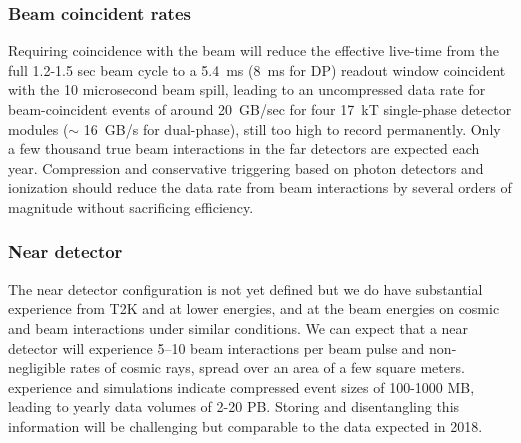 \subsubsection{Beam coincident rates}

Requiring  coincidence with the  beam will reduce the effective live-time from the full 1.2-1.5 sec beam cycle to a 5.4~ms (8~ms for DP)  readout window coincident with the 10 microsecond beam spill, leading to an uncompressed data rate for beam-coincident events of around 20~GB/sec for four 17~kT single-phase detector modules ($\sim$ 16~GB/s for dual-phase), still too high to record permanently.
Only a few thousand true beam interactions in the far detectors are expected each year.  Compression and conservative triggering based on photon detectors and ionization should reduce the data rate from beam interactions by several orders of magnitude without sacrificing efficiency.

\subsubsection{ Near detector} The near detector configuration is not yet defined  but we do have substantial experience from T2K and   at lower energies, and   at the   beam energies on cosmic and beam interactions under similar conditions.  We can expect that a near detector will experience \numrange{5}{10} beam interactions per beam pulse and non-negligible rates of cosmic rays, spread over an area of a few square meters.  experience and  simulations indicate compressed event sizes of 100-1000 MB, leading to yearly data volumes of 2-20 PB.  Storing and disentangling this information will be challenging but comparable to the  data expected in 2018.%




